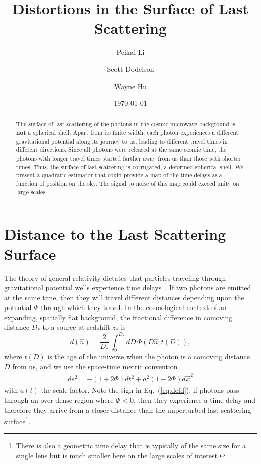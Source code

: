 \documentclass[prd,amsmath,amssymb,floatfix,superscriptaddress,nofootinbib,twocolumn]{revtex4-1}
\def\be{\begin{equation}}
\def\ee{\end{equation}}
\def\bea{\begin{eqnarray}}
\def\eea{\end{eqnarray}}
\newcommand{\ec}[1]{Eq.~(\ref{eq:#1})}
\newcommand{\eql}[1]{\label{eq:#1}}
\begin{document}
\title{Distortions in the Surface of Last Scattering}


\author{\large Peikai Li}
\author{\large Scott Dodelson}
\author{\large Wayne Hu}

\date{\today}

\begin{abstract}
The surface of last scattering of the photons in the cosmic microwave background is {\bf not} a spherical shell. Apart from its finite width, each photon experiences a different gravitational potential along its journey to us, leading to different travel times in different directions. Since all photons were released at the same cosmic time, the photons with longer travel times started farther away from us than those with shorter times. Thus, the surface of last scattering is corrugated, a deformed spherical shell. We present a quadratic estimator that could provide a map of the time delays as a function of position on the sky. The signal to noise of this map could exceed unity on large scales.
\end{abstract}

\maketitle

\section{Distance to the Last Scattering Surface}
\newcommand\fd{d}

The theory of general relativity dictates that particles traveling through gravitational potential wells experience time delays~\cite{1964PhRvL..13..789S}. If two photons are emitted at the same time, then they will travel different distances depending upon the potential $\Phi$ through which they travel. In the cosmological context of an expanding,  spatially flat background, the 
fractional difference in comoving distance
$D_*$ to a source at redshift $z_*$ is 
\be
d(\hat n) = \frac{2}{D_*}\, \int_0^{D_*} dD\, \Phi\left(D \hat n; t(D)\right)\eql{defd},
\ee
where %
$t(D)$ is the age of the universe when the photon is a comoving distance $D$ from us, and  we use the space-time metric convention 
\bea
ds^{2}= -(1+2\Phi)dt^{2}+a^{2}(1-2\Phi)d\vec{x}^{2}
\eea
with $a(t)$ the scale factor.
Note the sign in \ec{defd}: if photons pass through an over-dense region where $\Phi<0$, then they experience a time delay and therefore they arrive from a closer distance than the unperturbed last scattering surface\footnote{There is also a geometric time delay that is typically of the same size for a single lens but is much smaller here on the large scales of interest.}. 
\end{document}
